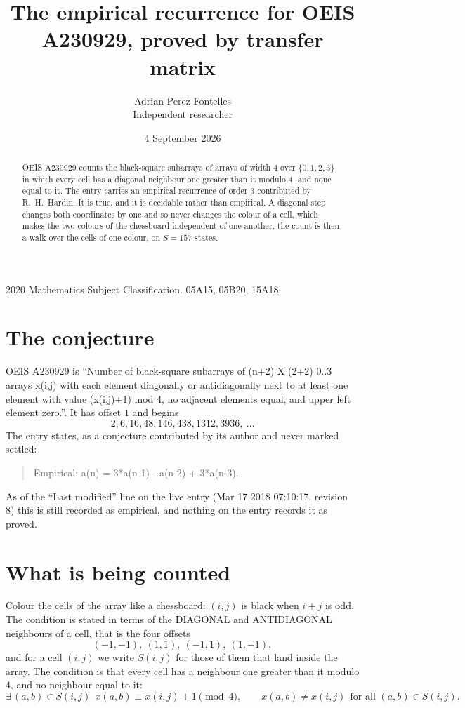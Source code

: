 \documentclass[11pt,a4paper]{article}
\title{The empirical recurrence for OEIS A230929, proved by transfer matrix}
\author{Adrian Perez Fontelles\\ \small Independent researcher}
\date{4 September 2026}
\theoremstyle{plain}
\theoremstyle{definition}
\begin{document}
\maketitle

\begin{abstract}
OEIS A230929 counts the black-square subarrays of arrays of width $4$ over $\{0,1,2,3\}$ in which
every cell has a diagonal neighbour one greater than it modulo 4, and none equal to it. The entry carries an empirical recurrence of order $3$ contributed by
R.~H.~Hardin. It is true, and it is decidable rather than empirical. A diagonal step changes
both coordinates by one and so never changes the colour of a cell, which makes the two colours
of the chessboard independent of one another; the count is then a walk over the cells of one
colour, on $S=157$ states.
\end{abstract}

\noindent\small 2020 Mathematics Subject Classification. 05A15, 05B20, 15A18.\normalsize

\section{The conjecture}

OEIS A230929 is ``Number of black-square subarrays of (n+2) X (2+2) 0..3 arrays x(i,j) with each element diagonally or antidiagonally next to at least one element with value (x(i,j)+1) mod 4, no adjacent elements equal, and upper left element zero.''. It has offset $1$ and begins
\[
2, 6, 16, 48, 146, 438, 1312, 3936,\ \dots
\]
The entry states, as a conjecture contributed by its author and never marked settled:
\begin{quote}
Empirical: a(n) = 3*a(n-1) - a(n-2) + 3*a(n-3).
\end{quote}
As of the ``Last modified'' line on the live entry (Mar 17 2018 07:10:17, revision 8) this is still
recorded as empirical, and nothing on the entry records it as proved.

\section{What is being counted}

Colour the cells of the array like a chessboard: $(i,j)$ is black when $i+j$ is odd. The
condition is stated in terms of the DIAGONAL and ANTIDIAGONAL neighbours of a cell, that is the
four offsets
\[
(-1,-1),\ (1,1),\ (-1,1),\ (1,-1),
\]
and for a cell $(i,j)$ we write $S(i,j)$ for those of them that land inside the array. The
condition is that every cell has a neighbour one greater than it modulo $4$, and no neighbour equal to it:
\[
\exists\,(a,b)\in S(i,j)\ \ x(a,b)\equiv x(i,j)+1 \!\!\pmod{4},\qquad x(a,b)\neq x(i,j)\ \ \text{for all }(a,b)\in S(i,j).
\]
\end{document}

